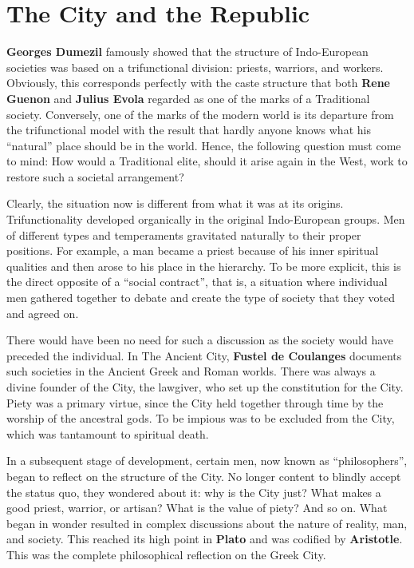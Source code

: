 \section{The City and the Republic}

\textbf{Georges Dumezil} famously showed that the structure of Indo-European societies was based on a trifunctional division: priests, warriors, and workers. Obviously, this corresponds perfectly with the caste structure that both \textbf{Rene Guenon} and \textbf{Julius Evola} regarded as one of the marks of a Traditional society. Conversely, one of the marks of the modern world is its departure from the trifunctional model with the result that hardly anyone knows what his ``natural'' place should be in the world. Hence, the following question must come to mind: How would a Traditional elite, should it arise again in the West, work to restore such a societal arrangement?

Clearly, the situation now is different from what it was at its origins. Trifunctionality developed organically in the original Indo-European groups. Men of different types and temperaments gravitated naturally to their proper positions. For example, a man became a priest because of his inner spiritual qualities and then arose to his place in the hierarchy. To be more explicit, this is the direct opposite of a ``social contract'', that is, a situation where individual men gathered together to debate and create the type of society that they voted and agreed on.

There would have been no need for such a discussion as the society would have preceded the individual. In The Ancient City, \textbf{Fustel de Coulanges} documents such societies in the Ancient Greek and Roman worlds. There was always a divine founder of the City, the lawgiver, who set up the constitution for the City. Piety was a primary virtue, since the City held together through time by the worship of the ancestral gods. To be impious was to be excluded from the City, which was tantamount to spiritual death.

In a subsequent stage of development, certain men, now known as ``philosophers'', began to reflect on the structure of the City. No longer content to blindly accept the status quo, they wondered about it: why is the City just? What makes a good priest, warrior, or artisan? What is the value of piety? And so on. What began in wonder resulted in complex discussions about the nature of reality, man, and society. This reached its high point in \textbf{Plato} and was codified by \textbf{Aristotle}. This was the complete philosophical reflection on the Greek City.


